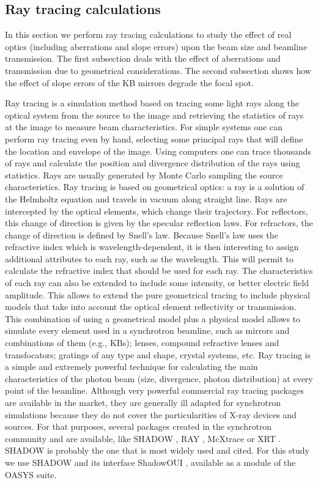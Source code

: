 \documentclass{iucr}              %
\begin{document}
% 
\subsection{Ray tracing calculations}
\label{level1}
In this section we perform ray tracing calculations to study the effect of real optics (including aberrations and slope errors) upon the beam size and beamline transmission. The first subsection deals with the effect of aberrations and transmission due to geometrical considerations. The second subsection shows how the effect of slope errors of the KB mirrors degrade the focal spot.  

Ray tracing is a simulation method based on tracing some light rays along the optical system from the source to the image and retrieving the statistics of rays at the image to measure beam characteristics. For simple systems one can perform ray tracing even by hand, selecting some principal rays that will define the location and envelope of the image. Using computers one can trace thousands of rays and calculate the position and divergence distribution of the rays using statistics. Rays are usually generated by Monte Carlo sampling the source characteristics. Ray tracing is based on geometrical optics: a ray is a solution of the Helmholtz equation and travels in vacuum along straight line. Rays are intercepted by the optical elements, which change their trajectory. For reflectors, this change of direction is given by the specular reflection laws. For refractors, the change of direction is defined by  Snell's law. Because Snell's law uses the refractive index which is wavelength-dependent, it is then interesting to assign additional attributes to each ray, such as the wavelength. This will permit to calculate the refractive index that should  be used for each ray. The characteristics of each ray can also be extended to include some intensity, or better electric field amplitude. This allows to extend the pure geometrical tracing to include physical models that take into account the optical element reflectivity or transmission. This combination of using a geometrical model plus a physical model allows to simulate every element used in a synchrotron beamline, such as mirrors and combinations of them (e.g., KBs); lenses, compound refractive lenses and transfocators; gratings of any type and shape, crystal systems, etc. Ray tracing is a simple and extremely powerful technique for calculating the main characteristics of the photon beam (size, divergence, photon distribution) at every point of the beamline. Although very powerful commercial ray tracing packages are available in the market, they are generally ill adapted for synchrotron simulations because they do not cover the particularities of X-ray devices and sources. For that purposes, several packages created in the synchrotron community and are available, like SHADOW \cite{codeSHADOW}, RAY \cite{codeRAY}, McXtrace \cite{codeMCXTRACE} or XRT \cite{codeXRT}. SHADOW is probably the one that is most widely used and cited. For this study we use SHADOW and its interface ShadowOUI \cite{codeSHADOWOUI}, available as a module of the OASYS suite.
\end{document}
